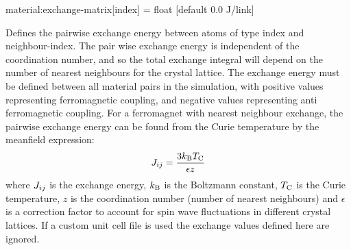 {\zicf material:exchange-matrix[index] = float [default 0.0 J/link]} Defines the pairwise exchange energy between atoms of type index and neighbour-index. The pair wise exchange energy is independent of the coordination number, and so the total exchange integral will depend on the number of nearest neighbours for the crystal lattice. The exchange energy must be defined between all material pairs in the simulation, with positive values representing ferromagnetic coupling, and negative values representing anti ferromagnetic coupling. For a ferromagnet with nearest neighbour exchange, the pairwise exchange energy can be found from the Curie temperature by the meanfield expression:
\begin{equation*}
J_{ij} = \frac{3k_\mathrm{B}T_{\mathrm{C}}}{\epsilon z}
\end{equation*}
where $J_{ij}$ is the exchange energy, $k_\mathrm{B}$ is the Boltzmann constant, $T_{\mathrm{C}}$ is the Curie temperature, $z$ is the coordination number (number of nearest neighbours) and $\epsilon$ is a correction factor to account for spin wave fluctuations in different crystal lattices. If a custom unit cell file is used the exchange values defined here are ignored.\\



